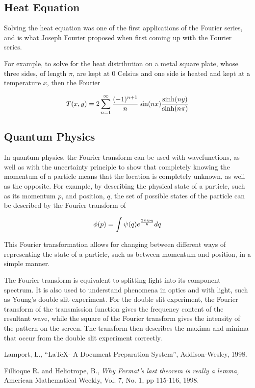 \documentclass{article}
\begin{document}
\subsection{Heat Equation}
Solving the heat equation was one of the first applications of the Fourier series, and is what Joseph Fourier proposed when first coming up with the Fourier series.

For example, to solve for the heat distribution on a metal square plate, whose three sides, of length $\pi$, are kept at 0 Celsius and one side is heated and kept at a temperature $x$, then the Fourier 

$$T(x,y) = 2\sum_{n=1}^\infty \frac{(-1)^{n+1}}{n} \sin(nx) {\sinh(ny) \over \sinh(n\pi)}$$

\subsection{Quantum Physics}
In quantum physics, the Fourier transform can be used with wavefunctions, as well as with the uncertainty principle to show that completely knowing the momentum of a particle means that the location is completely unknown, as well as the opposite. For example, by describing the physical state of a particle, such as its momentum $p$, and position, $q$, the set of possible states of the particle can be described by the Fourier transform of 

$$\phi(p) = \int \psi (q) e^{2\pi i pq\over h} dq$$

This Fourier transformation allows for changing between different ways of representing the state of a particle, such as between momentum and position, in a simple manner. 

The Fourier transform is equivalent to splitting light into its component spectrum. It is also used to understand phenomena in optics and with light, such as Young's double slit experiment. For the double slit experiment, the Fourier transform of the transmission function gives the frequency content of the resultant wave, while the square of the Fourier transform gives the intensity of the pattern on the screen. The transform then describes the maxima and minima that occur from the double slit experiment correctly.

\begin{thebibliography}{9}
         {\sc Lamport, L.,}
         ``\LaTeX - A Document Preparation System'',
         Addison-Wesley, 1998.

         {\sc Fillioque R.} and {\sc Heliotrope, B.,}
         {\em Why Fermat's last theorem is really a lemma,}
         American Mathematical Weekly,
         Vol. 7, No. 1, pp 115-116, 1998.

\end{thebibliography}
\end{document}
